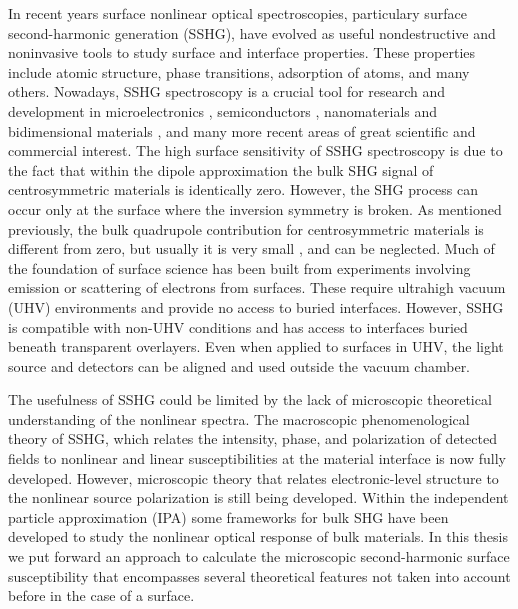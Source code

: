 In recent years surface nonlinear optical spectroscopies, particulary surface
second-harmonic generation (SSHG), have evolved as useful nondestructive and
noninvasive tools to study surface and interface properties. These properties
include atomic structure, phase transitions, adsorption of atoms, and many
others.\cite{daumPRL93, mcgilpOE94, meyerPRL95, powerPRL95, godefroyAPL96,
hoferAPA96, dadapPRB97, bloembergenAPB99, mcgilpSRL99, suzukiAPB99,
mitchellSS01, hughesPRB96, guyotPRB88, downerPSSA01, shenAPB99, shenNAT89,
chenPRL81, mendozaPRL98, downerSIA01} Nowadays, SSHG spectroscopy is a crucial
tool for research and development in microelectronics \cite{zheltikovLP00},
semiconductors \cite{lupkeSSR99}, nanomaterials and bidimensional materials
\cite{deanPRB14, malardPRB13}, and many more recent areas of great scientific
and commercial interest.\cite{cazzanelliNM14} The high surface sensitivity of
SSHG spectroscopy is due to the fact that within the dipole approximation the
bulk SHG signal of centrosymmetric materials is identically zero. However, the
SHG process can occur only at the surface where the inversion symmetry is
broken. As mentioned previously, the bulk quadrupole contribution for
centrosymmetric materials is different from zero, but usually it is very small
\cite{downerSIA01}, and can be neglected. Much of the foundation of surface
science has been built from experiments involving emission or scattering of
electrons from surfaces. These require ultrahigh vacuum (UHV) environments and
provide no access to buried interfaces. However, SSHG is compatible with non-UHV
conditions and has access to interfaces buried beneath transparent overlayers.
Even when applied to surfaces in UHV, the light source and detectors can be
aligned and used outside the vacuum chamber.

The usefulness of SSHG could be limited by the lack of microscopic theoretical
understanding of the nonlinear spectra. The macroscopic phenomenological theory
of SSHG, which relates the intensity, phase, and polarization of detected fields
to nonlinear and linear susceptibilities at the material interface is now fully
developed.\cite{downerSIA01} However, microscopic theory that relates
electronic-level structure to the nonlinear source polarization is still being
developed. \cite{butcherPOPS63, aspnesPRB72, sipePRB93, levinePRB94,
aversaPRB95, hughesPRB96, rashkeevPRB98, beyond,mendozaPRL98, arzatePRB01,
mendozaPRB01, mejiaPRB02, sanoPRB02, mejiaRMF04, trollePRB14} Within the
independent particle approximation (IPA) some frameworks for bulk SHG have been
developed to study the nonlinear optical response of bulk materials.
\cite{butcherPOPS63, aspnesPRB72, sipePRB93, levinePRB94,aversaPRB95,
hughesPRB96, rashkeevPRB98} In this thesis we put forward an approach to
calculate the microscopic second-harmonic surface susceptibility that
encompasses several theoretical features not taken into account before in the
case of a surface.

